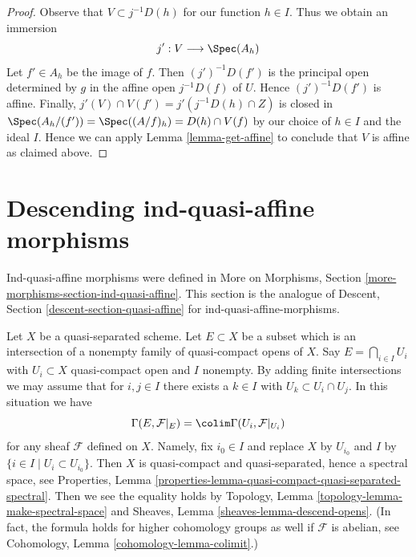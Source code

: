 \begin{proof}
\medskip\noindent
Observe that $V \subset j^{-1}D(h)$ for our function $h \in I$.
Thus we obtain an immersion
$$
j' : V \longrightarrow \Spec(A_h)
$$
Let $f' \in A_h$ be the image of $f$. Then $(j')^{-1}D(f')$
is the principal open determined by $g$ in the affine
open $j^{-1}D(f)$ of $U$.
Hence $(j')^{-1}D(f')$ is affine. Finally,
$j'(V) \cap V(f') = j'(j^{-1}D(h) \cap Z)$
is closed in $\Spec(A_h/(f')) = \Spec((A/f)_h) = D(h) \cap V(f)$
by our choice of $h \in I$ and the ideal $I$. Hence we can apply
Lemma \ref{lemma-get-affine}
to conclude that $V$ is affine as claimed above.
\end{proof}







\section{Descending ind-quasi-affine morphisms}
\label{section-ind-quasi-affine}

\noindent
Ind-quasi-affine morphisms were defined in
More on Morphisms, Section \ref{more-morphisms-section-ind-quasi-affine}.
This section is the analogue of
Descent, Section \ref{descent-section-quasi-affine}
for ind-quasi-affine-morphisms.

\medskip\noindent
Let $X$ be a quasi-separated scheme. Let $E \subset X$ be a subset
which is an intersection of a nonempty family of quasi-compact opens of $X$.
Say $E = \bigcap_{i \in I} U_i$ with $U_i \subset X$ quasi-compact open
and $I$ nonempty.
By adding finite intersections we may assume that for $i, j \in I$
there exists a $k \in I$ with $U_k \subset U_i \cap U_j$.
In this situation we have
\begin{equation}
\label{equation-sections-of-intersection}
\Gamma(E, \mathcal{F}|_E) = \colim \Gamma(U_i, \mathcal{F}|_{U_i})
\end{equation}
for any sheaf $\mathcal{F}$ defined on $X$. Namely, fix $i_0 \in I$
and replace $X$ by $U_{i_0}$ and $I$ by
$\{i \in I \mid U_i \subset U_{i_0}\}$. Then $X$ is quasi-compact
and quasi-separated, hence a spectral space, see
Properties, Lemma
\ref{properties-lemma-quasi-compact-quasi-separated-spectral}.
Then we see the equality holds by
Topology, Lemma \ref{topology-lemma-make-spectral-space} and
Sheaves, Lemma \ref{sheaves-lemma-descend-opens}.
(In fact, the formula holds for higher cohomology groups
as well if $\mathcal{F}$ is abelian, see
Cohomology, Lemma \ref{cohomology-lemma-colimit}.)

